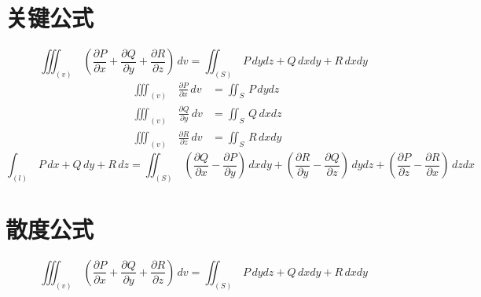 \documentclass[11pt]{ctexart}
\begin{document}
	\section{关键公式}
	\[
	\boxed{
		\iiint_{\left(v\right)} \, 
		\left(
		 \frac{\partial P}{\partial x} 
		+ \frac{\partial Q}{\partial y} 
		+ \frac{\partial R}{\partial z}
		\right)
		\,
		dv
		=
		\iint_{\left(S\right)} \,
		P \, dydz + Q \, dxdy +R \, dxdy
	}
	\]
	\[
	\boxed{
		\begin{aligned}
			& 	\iiint_{\left( v \right)} \, & \frac{\partial P}{\partial x} \, dv &	= \iint_S \, P \, dydz \\
			& 	\iiint_{\left( v \right)} \, & \frac{\partial Q}{\partial y} \, dv &	= \iint_S \, Q \, dxdz \\
			& 	\iiint_{\left( v \right)} \, & \frac{\partial R}{\partial z} \, dv &	= \iint_S \, R \, dxdy
		\end{aligned}
	}
	\]
	\[
	\boxed{
	\int_{\left( l \right)} \, P \, dx 
	+ Q \, dy 
	+ R \, dz
	=
	\iint_{\left( S \right)} \, 
	\left( \frac{\partial Q}{\partial x} - \frac{\partial P}{\partial y}\right) \, dxdy 
	+ \left( \frac{\partial R}{\partial y} - \frac{\partial Q}{\partial z}\right) \, dydz 
	+ \left( \frac{\partial P}{\partial z} - \frac{\partial R}{\partial x}\right) \, dzdx 
	}
	\]
	\section{散度公式}
	\[
	\boxed{
		\iiint_{\left(v\right)} \, 
		\left(
		 \frac{\partial P}{\partial x} 
		+ \frac{\partial Q}{\partial y} 
		+ \frac{\partial R}{\partial z}
		\right)
		\,
		dv
		=
		\iint_{\left(S\right)} \,
		P \, dydz + Q \, dxdy +R \, dxdy
	}
	\]
\end{document}
